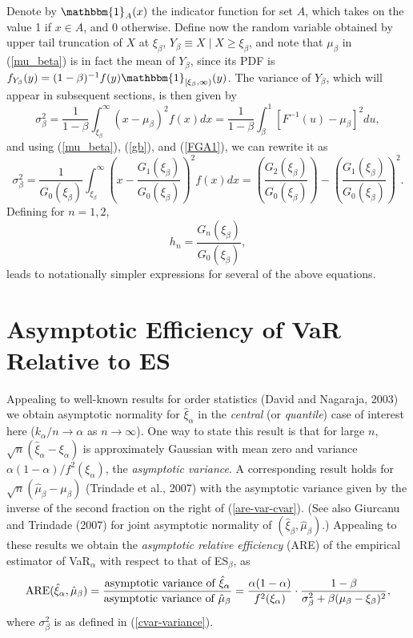 \documentclass[11pt]{article}
\newcommand{\are}{{\text{ARE}}}
\newcommand{\be}{\begin{equation}}
\newcommand{\ee}{\end{equation}}
\newcommand{\indicator}[1]{\mathbbm{1}_{{#1}}}
\newcommand{\etal}{et al.}
\newcommand{\varalph}{\ensuremath{\xi_{\alpha}}}
\newcommand{\var}{\ensuremath{\xi_{\beta}}}
\newcommand{\B}{\ensuremath{\xi_{\beta}}}
\newcommand{\cvar}{\ensuremath{\mu_{\beta}}}
\newcommand{\hvar}{\ensuremath{\hat{\xi}_{\beta}}}
\newcommand{\hvaralph}{\ensuremath{\hat{\xi}_{\alpha}}}
\newcommand{\hcvar}{\ensuremath{\hat{\mu}_{\beta}}}
\newcommand{\al}{\ensuremath{\beta}}
\newcommand{\nc}{\normalcolor}
\begin{document}
Denote by $\indicator{A}(x)$ the indicator function for
set $A$, which takes on the value 1 if $x\in A$, and 0 otherwise.
Define now the random variable obtained by upper tail truncation of
$X$ at $\var$, 
$Y_\al\equiv X\mid X\geq\var$,
and note that $\mu_{\beta}$ in (\ref{mu_beta}) is in fact the mean
of $Y_\al$, since its PDF is $f_{Y_\al}(y)=(1 -
\beta)^{-1}f(y)\indicator{[\var,\infty)}(y)$. \nc 
The  variance of $Y_\al$, which will appear in subsequent sections, is
then given by 
\be\label{cvar-variance} 
\sigma^2_{\beta} = \frac{1}{1-\beta} \int_{\B}^{\infty} \left(x -
  \mu_{\beta}\right)^2f(x) dx = \frac{1}{1-\beta} \int_{\beta}^1
[F^{-1}(u)-\mu_{\beta}]^2 du,
\ee 
and using (\ref{mu_beta}), (\ref{gb}),  and (\ref{FGA1}), \nc we can rewrite it as
\be \label{sb2}
\sigma_{\beta}^2  = \frac{1}{G_0(\B)} \int_{\B}^{\infty}
\left(x -  \frac{G_1(\B)}{G_0(\B)}\right)^2f(x) dx = \left(\frac{G_2(\B)}{G_0(\B)}\right) -\left(\frac{G_1(\B)}{G_0(\B)}\right)^2.
\ee
Defining for $n=1,2$,
\be\label{helper-hn}
 h_n = \frac{G_n(\B)}{G_0(\B)},
\ee 
leads to notationally simpler expressions for several of the above equations.



\section{Asymptotic Efficiency of VaR Relative to ES}\label{sec:main}
Appealing to well-known results for order statistics (David and
Nagaraja, 2003) we  obtain asymptotic normality for $\hvaralph$ in
the \emph{central} (or \emph{quantile}) case of interest here  ($k_{\alpha}/n\rightarrow\alpha$ as
$n\rightarrow\infty$).  One way to state this result is that for large
$n$, $\sqrt{n}(\hvaralph-\varalph)$ is approximately Gaussian with mean zero and
variance  $\alpha(1-\alpha)/f^2(\varalph)$, the \emph{asymptotic variance}.
A corresponding result holds for $\sqrt{n}(\hcvar-\cvar)$  (Trindade
\etal{}, 2007) with the asymptotic variance given by the
inverse of the second
fraction on the right of (\ref{are-var-cvar}). \nc (See also Giurcanu and
Trindade (2007) for joint asymptotic normality of
$(\hvar,\hcvar)$.) Appealing to these results we obtain the \emph{asymptotic relative efficiency} (ARE) of the
empirical estimator of VaR$_{\alpha}$ with respect to that of ES$_{\al}$, as
\be\label{are-var-cvar}
\are(\hvaralph,\hcvar) \nc = \frac{\text{asymptotic variance of }\hvaralph}{\text{asymptotic variance of }\hcvar} = \frac{\alpha(1-\alpha)}{f^2(\varalph)}\cdot \frac{1-\beta}{\sigma_{\beta}^2 + \beta(\mu_{\beta} - \var)^2},
\ee
where $\sigma^2_{\beta}$ is as defined in
(\ref{cvar-variance}). 
\end{document}
